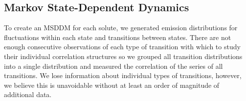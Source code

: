 \documentclass{article}
\begin{document}


  \subsection{Markov State-Dependent Dynamics}\label{section:msm_results}
  
  
  To create an MSDDM for each solute, we generated emission distributions for
  fluctuations within each state and transitions between states. There are not
  enough consecutive observations of each type of transition with which to study
  their individual correlation structures so we grouped all transition distributions
  into a single distribution and measured the correlation of the series of all 
  transitions. We lose information about individual types of transitions, however, 
  we believe this is unavoidable without at least an order of magnitude of additional data.
  
\end{document}
